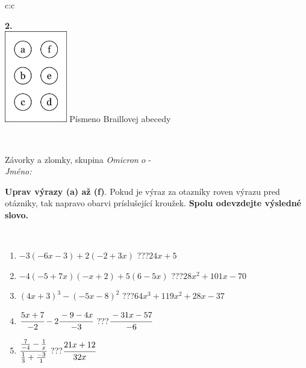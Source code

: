 \documentclass[10pt]{report}
\newcommand\omicron{o}
\begin{document}
\begin{tabular}{c:c}
\begin{minipage}[c][104.5mm][t]{0.5\linewidth}
\begin{center}
\begin{minipage}{0.20\linewidth}
\begin{center}
{\Huge\bfseries 2.} \\[2mm]
\includegraphics[height=40mm]{../images/braille.png}
{\small Písmeno Braillovej abecedy}
\end{center}
\end{minipage}
\end{center}
\end{minipage}
\\ \hdashline
\begin{minipage}[c][104.5mm][t]{0.5\linewidth}
\begin{center}
\vspace{7mm}
{\huge Závorky a zlomky, skupina \textit{Omicron $\omicron$} -}\\[5mm]
\textit{Jméno:}\phantom{xxxxxxxxxxxxxxxxxxxxxxxxxxxxxxxxxxxxxxxxxxxxxxxxxxxxxxxxxxxxxxxxx}\\[5mm]
\begin{minipage}{0.95\linewidth}
\begin{center}
\textbf{Uprav výrazy (a) až (f)}. Pokud je výraz za otazníky roven výrazu pred otázniky, tak napravo obarvi príslušející kroužek. \textbf{Spolu odevzdejte výsledné slovo.}
\end{center}
\end{minipage}
\\[1mm]
\begin{minipage}{0.79\linewidth}
\begin{center}
\begin{varwidth}{\linewidth}
\begin{enumerate}
\normalsize
\item $-3(-6x-3)+2(-2+3x)$\quad \dotfill\; ???\;\dotfill \quad $24x+5$
\item $-4(-5+7x)(-x+2)+5(6-5x)$\quad \dotfill\; ???\;\dotfill \quad $28x^2+101x-70$
\item $(4x+3)^3-(-5x-8)^2$\quad \dotfill\; ???\;\dotfill \quad $64x^3+119x^2+28x-37$
\item $\cfrac{5x+7}{-2}-2\cfrac{-9-4x}{-3}$\quad \dotfill\; ???\;\dotfill \quad $\cfrac{-31x-57}{-6}$
\item $\cfrac{\frac{7}{-4}-\frac{1}{x}}{\frac{1}{3}+\frac{-3}{1}}$\quad \dotfill\; ???\;\dotfill \quad $\cfrac{21x+12}{32x}$

\end{enumerate}
\end{varwidth}
\end{center}
\end{minipage}
\end{center}
\end{minipage}
\end{tabular}
\end{document}
